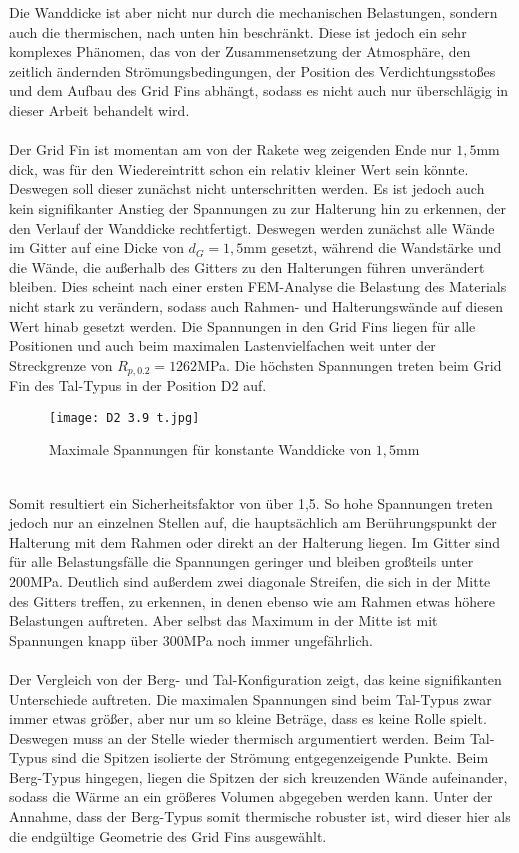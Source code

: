 Die Wanddicke ist aber nicht nur durch die mechanischen Belastungen, sondern auch die thermischen, nach unten hin beschränkt. Diese ist jedoch ein sehr komplexes Phänomen, das von der Zusammensetzung der Atmosphäre, den zeitlich ändernden Strömungsbedingungen, der Position des Verdichtungsstoßes und dem Aufbau des Grid Fins abhängt, sodass es nicht auch nur überschlägig in dieser Arbeit behandelt wird.
\\~\\
Der Grid Fin ist momentan am von der Rakete weg zeigenden Ende nur $1,5$mm dick, was für den Wiedereintritt schon ein relativ kleiner Wert sein könnte. Deswegen soll dieser zunächst nicht unterschritten werden. Es ist jedoch auch kein signifikanter Anstieg der Spannungen zu zur Halterung hin zu erkennen, der den Verlauf der Wanddicke rechtfertigt. Deswegen werden zunächst alle Wände im Gitter auf eine Dicke von $d_G = 1,5$mm gesetzt, während die Wandstärke und die Wände, die außerhalb des Gitters zu den Halterungen führen unverändert bleiben. Dies scheint nach einer ersten FEM-Analyse die Belastung des Materials nicht stark zu verändern, sodass auch Rahmen- und Halterungswände auf diesen Wert hinab gesetzt werden. Die Spannungen in den Grid Fins liegen für alle Positionen und auch beim maximalen Lastenvielfachen weit unter der Streckgrenze von $R_{p, 0.2} = 1262$MPa. Die höchsten Spannungen treten beim Grid Fin des Tal-Typus in der Position D2 auf. 
\begin{figure}[h] 
	\centering
	\texttt{[image: D2 3.9 t.jpg]}
	\caption{Maximale Spannungen für konstante Wanddicke von $1,5$mm}
\end{figure}\\
Somit resultiert ein Sicherheitsfaktor von über 1,5. So hohe Spannungen treten jedoch nur an einzelnen Stellen auf, die hauptsächlich am Berührungspunkt der Halterung mit dem Rahmen oder direkt an der Halterung liegen. Im Gitter sind für alle Belastungsfälle die Spannungen geringer und bleiben großteils unter 200MPa. Deutlich sind außerdem zwei diagonale Streifen, die sich in der Mitte des Gitters treffen, zu erkennen, in denen ebenso wie am Rahmen etwas höhere Belastungen auftreten. Aber selbst das Maximum in der Mitte ist mit Spannungen knapp über 300MPa noch immer ungefährlich.
\\~\\
Der Vergleich von der Berg- und Tal-Konfiguration zeigt, das keine signifikanten Unterschiede auftreten. Die maximalen Spannungen sind beim Tal-Typus zwar immer etwas größer, aber nur um so kleine Beträge, dass es keine Rolle spielt. Deswegen muss an der Stelle wieder thermisch argumentiert werden. Beim Tal-Typus sind die Spitzen isolierte der Strömung entgegenzeigende Punkte. Beim Berg-Typus hingegen, liegen die Spitzen der sich kreuzenden Wände aufeinander, sodass die Wärme an ein größeres Volumen abgegeben werden kann. Unter der Annahme, dass der Berg-Typus somit thermische robuster ist, wird dieser hier als die endgültige Geometrie des Grid Fins ausgewählt.
